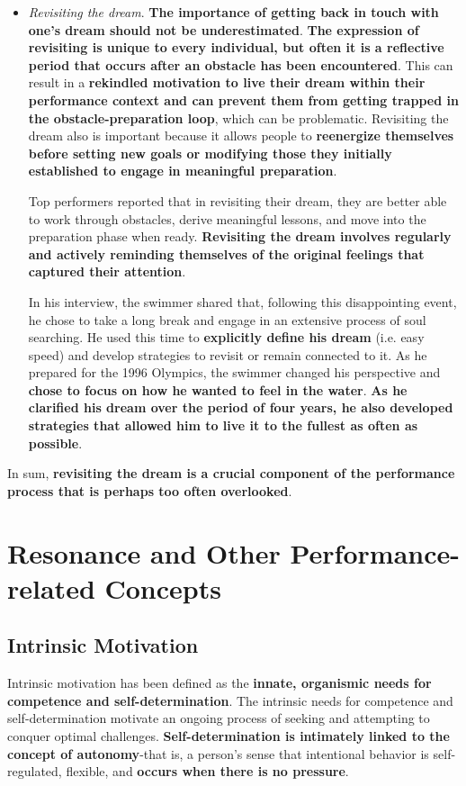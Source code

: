 \documentclass[ebook,12pt,oneside,openany]{memoir}
\begin{document}
\begin{itemize}
    \item \textit{Revisiting the dream}. \textbf{The importance of getting back in touch with one's dream should not be underestimated}.
    \textbf{The expression of revisiting is unique to every individual, but often it is a reflective period that occurs after an obstacle has been encountered}.
    This can result in a \textbf{rekindled motivation to live their dream within their performance context and can prevent them from getting trapped in the obstacle-preparation loop}, which can be problematic.
    Revisiting the dream also is important because it allows people to \textbf{reenergize themselves before setting new goals or modifying those they initially established to engage in meaningful preparation}.

    Top performers reported that in revisiting their dream, they are better able to work through obstacles, derive meaningful lessons, and move into the preparation phase when ready.
    \textbf{Revisiting the dream involves regularly and actively reminding themselves of the original feelings that captured their attention}.

    In his interview, the swimmer shared that, following this disappointing event, he chose to take a long break and engage in an extensive process of soul searching.
    He used this time to \textbf{explicitly define his dream} (i.e. easy speed) and develop strategies to revisit or remain connected to it. 
    As he prepared for the 1996 Olympics, the swimmer changed his perspective and \textbf{chose to focus on how he wanted to feel in the water}.
    \textbf{As he clarified his dream over the period of four years, he also developed strategies that allowed him to live it to the fullest as often as possible}.

\end{itemize}

In sum, \textbf{revisiting the dream is a crucial component of the performance process that is perhaps too often overlooked}.

\section{Resonance and Other Performance-related Concepts}
\subsection{Intrinsic Motivation}
Intrinsic motivation has been defined as the \textbf{innate, organismic needs for competence and self-determination}.
The intrinsic needs for competence and self-determination motivate an ongoing process of seeking and attempting to conquer optimal challenges.
\textbf{Self-determination is intimately linked to the concept of autonomy}-that is, a person's sense that intentional behavior is self-regulated, flexible, and 
\textbf{occurs when there is no pressure}. 
\end{document}
